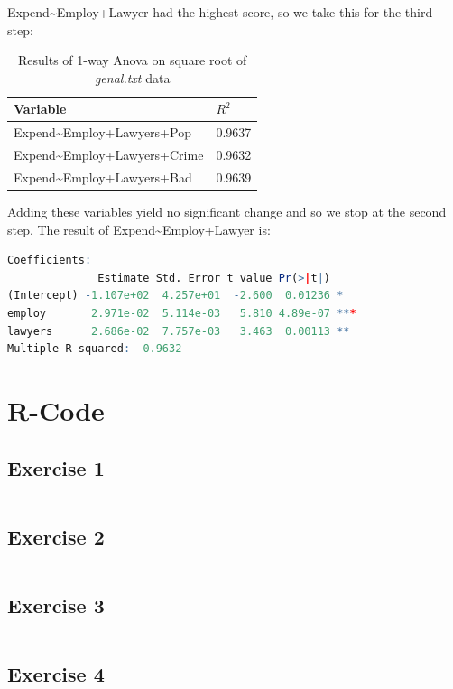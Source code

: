 \documentclass{article}
\begin{document}
    Expend\textasciitilde Employ+Lawyer had the highest score, so we take this for the third step:
    \begin{table}[H]
    \begin{center}
    \begin{tabular}{l|l}
        Variable & $R^2$ \\
        \hline 
        Expend\textasciitilde Employ+Lawyers+Pop & 0.9637 \\
        Expend\textasciitilde Employ+Lawyers+Crime & 0.9632 \\
        Expend\textasciitilde Employ+Lawyers+Bad & 0.9639 \\
    \end{tabular}
    \caption{Results of 1-way Anova on square root of \textit{genal.txt} data}
    \label{table:step3}
    \end{center}
    \end{table}
    Adding these variables yield no significant change and so we stop at the second step.
    The result of Expend\textasciitilde Employ+Lawyer is:\\
    \begin{lstlisting}[language=R]
Coefficients:
              Estimate Std. Error t value Pr(>|t|)    
(Intercept) -1.107e+02  4.257e+01  -2.600  0.01236 *  
employ       2.971e-02  5.114e-03   5.810 4.89e-07 ***
lawyers      2.686e-02  7.757e-03   3.463  0.00113 ** 
Multiple R-squared:  0.9632
    \end{lstlisting}
    
  \section{R-Code}
    \subsection{Exercise 1}\label{sec:RE1}
      \begin{lstlisting}[language=R]
      \end{lstlisting}
    \subsection{Exercise 2}\label{sec:RE2}
      \begin{lstlisting}[language=R]
      \end{lstlisting}
    \subsection{Exercise 3}\label{sec:RE3}
      \begin{lstlisting}[language=R]
      \end{lstlisting}
    \subsection{Exercise 4}\label{sec:RE4}
      \begin{lstlisting}[language=R]
      \end{lstlisting}
\end{document}
